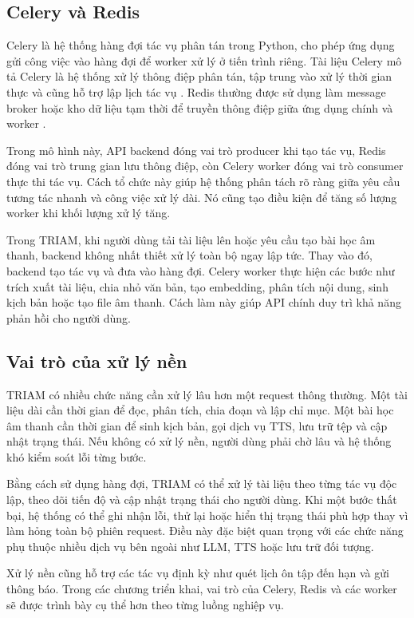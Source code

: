 \documentclass[12pt,a4paper]{report}
\begin{document}
\subsection{Celery và Redis}

Celery là hệ thống hàng đợi tác vụ phân tán trong Python, cho phép ứng dụng gửi công việc vào hàng đợi để worker xử lý ở tiến trình riêng. Tài liệu Celery mô tả Celery là hệ thống xử lý thông điệp phân tán, tập trung vào xử lý thời gian thực và cũng hỗ trợ lập lịch tác vụ \cite{celeryDocs}. Redis thường được sử dụng làm message broker hoặc kho dữ liệu tạm thời để truyền thông điệp giữa ứng dụng chính và worker \cite{redisDocs}.

Trong mô hình này, API backend đóng vai trò producer khi tạo tác vụ, Redis đóng vai trò trung gian lưu thông điệp, còn Celery worker đóng vai trò consumer thực thi tác vụ. Cách tổ chức này giúp hệ thống phân tách rõ ràng giữa yêu cầu tương tác nhanh và công việc xử lý dài. Nó cũng tạo điều kiện để tăng số lượng worker khi khối lượng xử lý tăng.

Trong TRIAM, khi người dùng tải tài liệu lên hoặc yêu cầu tạo bài học âm thanh, backend không nhất thiết xử lý toàn bộ ngay lập tức. Thay vào đó, backend tạo tác vụ và đưa vào hàng đợi. Celery worker thực hiện các bước như trích xuất tài liệu, chia nhỏ văn bản, tạo embedding, phân tích nội dung, sinh kịch bản hoặc tạo file âm thanh. Cách làm này giúp API chính duy trì khả năng phản hồi cho người dùng.

\subsection{Vai trò của xử lý nền}

TRIAM có nhiều chức năng cần xử lý lâu hơn một request thông thường. Một tài liệu dài cần thời gian để đọc, phân tích, chia đoạn và lập chỉ mục. Một bài học âm thanh cần thời gian để sinh kịch bản, gọi dịch vụ TTS, lưu trữ tệp và cập nhật trạng thái. Nếu không có xử lý nền, người dùng phải chờ lâu và hệ thống khó kiểm soát lỗi từng bước.

Bằng cách sử dụng hàng đợi, TRIAM có thể xử lý tài liệu theo từng tác vụ độc lập, theo dõi tiến độ và cập nhật trạng thái cho người dùng. Khi một bước thất bại, hệ thống có thể ghi nhận lỗi, thử lại hoặc hiển thị trạng thái phù hợp thay vì làm hỏng toàn bộ phiên request. Điều này đặc biệt quan trọng với các chức năng phụ thuộc nhiều dịch vụ bên ngoài như LLM, TTS hoặc lưu trữ đối tượng.

Xử lý nền cũng hỗ trợ các tác vụ định kỳ như quét lịch ôn tập đến hạn và gửi thông báo. Trong các chương triển khai, vai trò của Celery, Redis và các worker sẽ được trình bày cụ thể hơn theo từng luồng nghiệp vụ.
\end{document}
